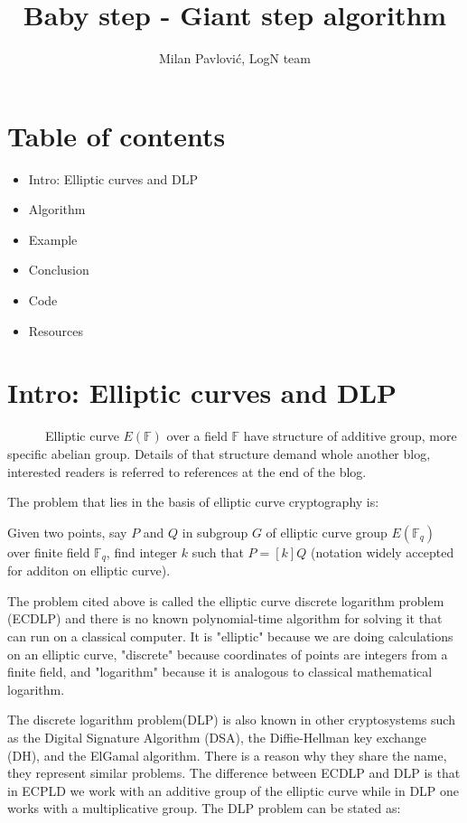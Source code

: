 \documentclass[fleqn,10pt]{olplainarticle}
\title{Baby step - Giant step algorithm}
\author[1]{Milan Pavlović, LogN team}
\begin{document}
\flushbottom
\maketitle
\thispagestyle{empty}

\section*{Table of contents}

\begin{itemize}[noitemsep] 
    \item Intro: Elliptic curves and DLP
    \item Algorithm
    \item Example
    \item Conclusion
    \item Code
    \item Resources
\end{itemize}


\section*{Intro: Elliptic curves and DLP}

\par \ \ \ \ \ \ Elliptic curve $E(\mathbb{F})$ over a field $\mathbb{F}$ have structure 
of additive group, more specific abelian group. Details of that structure demand whole another 
blog, interested readers is referred to references at the end of the blog. 

The problem that lies in the basis of elliptic curve cryptography is: 
\vspace{0.2cm}

Given two points, say $P$ and $Q$ in subgroup $G$ of elliptic curve group 
$E(\mathbb{F}_q)$ over finite field $\mathbb{F}_q$, find integer $k$ such that 
$P=[k]Q$ (notation widely accepted for additon on elliptic curve).

\vspace{0.2cm}

The problem cited above is called the elliptic curve discrete logarithm problem (ECDLP) 
and there is no known polynomial-time algorithm for solving it that can run on a classical computer. 
It is "elliptic" because we are doing calculations on an elliptic curve, "discrete" because 
coordinates of points are integers from a finite field, and "logarithm" because it is analogous to 
classical mathematical logarithm.

The discrete logarithm problem(DLP) is also known in other cryptosystems such as 
the Digital Signature Algorithm (DSA), the Diffie-Hellman key exchange (DH), and the ElGamal algorithm. 
There is a reason why they share the name, they represent similar problems. 
The difference between ECDLP and DLP is that in ECPLD we work with an additive group 
of the elliptic curve while in DLP one works with a multiplicative group. 
The DLP problem can be stated as:
\vspace{0.2cm}
\end{document}
